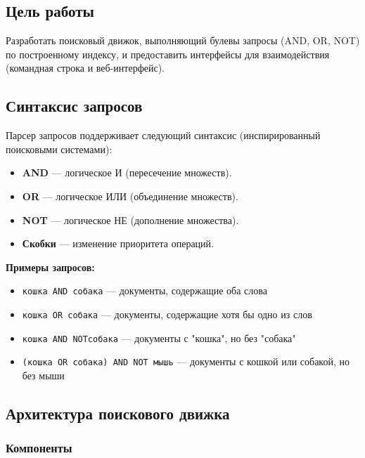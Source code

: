 \documentclass[a4paper,12pt]{article}
\begin{document}
\subsection{Цель работы}
Разработать поисковый движок, выполняющий булевы запросы (AND, OR, NOT) по построенному индексу, и предоставить интерфейсы для взаимодействия (командная строка и веб-интерфейс).

\subsection{Синтаксис запросов}

Парсер запросов поддерживает следующий синтаксис (инспирированный поисковыми системами):

\begin{itemize}
    \item \textbf{AND} — логическое И (пересечение множеств).
    \item \textbf{OR} — логическое ИЛИ (объединение множеств).
    \item \textbf{NOT} — логическое НЕ (дополнение множества).
    \item \textbf{Скобки} — изменение приоритета операций.
\end{itemize}

\textbf{Примеры запросов:}
\begin{itemize}
    \item \texttt{кошка AND собака} — документы, содержащие оба слова
    \item \texttt{кошка OR собака} — документы, содержащие хотя бы одно из слов
    \item \texttt{кошка AND NOTсобака} — документы с "кошка", но без "собака"
    \item \texttt{(кошка OR собака) AND NOT мышь} — документы с кошкой или собакой, но без мыши
\end{itemize}

\subsection{Архитектура поискового движка}

\subsubsection{Компоненты}
\end{document}
